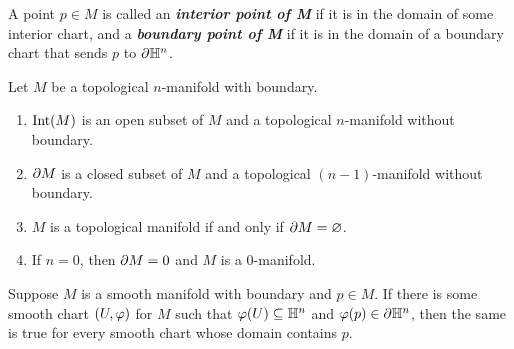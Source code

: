 \dfn A point $p\in M$ is called an \textbf{\textit{interior point of M}} if it is in the domain of some interior chart, and a \textbf{\textit{boundary point of M}} if it is in the domain of a boundary chart that sends $p$ to $\partial\mathbb{H}^n$.

\setcounter{thm}{37}

\begin{thm}Let $M$ be a topological $n$-manifold with boundary.
\begin{enumerate}
    \item $\text{Int}(M)$ is an open subset of $M$ and a topological $n$-manifold without boundary.
    \item $\partial M$ is a closed subset of $M$ and a topological $(n - 1)$-manifold without boundary.
    \item $M$ is a topological manifold if and only if $\partial M = \varnothing$.
    \item If $n = 0$, then $\partial M = 0$ and $M$ is a $0$-manifold.
\end{enumerate}
\end{thm}

\setcounter{thm}{45}

\begin{thm}
Suppose $M$ is a smooth manifold with boundary and $p\in M$. If there is some smooth chart $(U, \varphi)$ for $M$ such that $\varphi(U) \subseteq \mathbb{H}^n$ and $\varphi(p)\in \partial \mathbb{H}^n$, then the same is true for every smooth chart whose domain contains $p$.
\end{thm}








